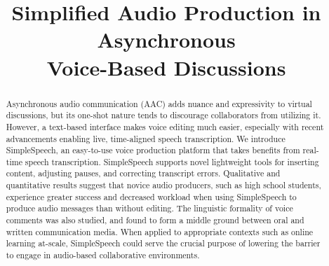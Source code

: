 \documentclass{sigchi}
\begin{document}
\title{Simplified Audio Production in Asynchronous \\ Voice-Based Discussions}

\author{%
}

\maketitle

\begin{abstract}
Asynchronous audio communication (AAC) adds nuance and expressivity to virtual discussions, but its one-shot nature tends to discourage collaborators from utilizing it.
However, a text-based interface makes voice editing much easier, especially with recent advancements enabling live, time-aligned speech transcription.
We introduce SimpleSpeech, an easy-to-use voice production platform that takes benefits from real-time speech transcription. SimpleSpeech supports novel lightweight tools for inserting content, adjusting pauses, and correcting transcript errors.
Qualitative and quantitative results suggest that novice audio producers, such as high school students, experience greater success and decreased workload when using SimpleSpeech to produce audio messages than without editing.
The linguistic formality of voice comments was also studied, and found to form a middle ground between oral and written communication media.
When applied to appropriate contexts such as online learning at-scale, SimpleSpeech could serve the crucial purpose of lowering the barrier to engage in audio-based collaborative environments.
\end{abstract}
\end{document}
